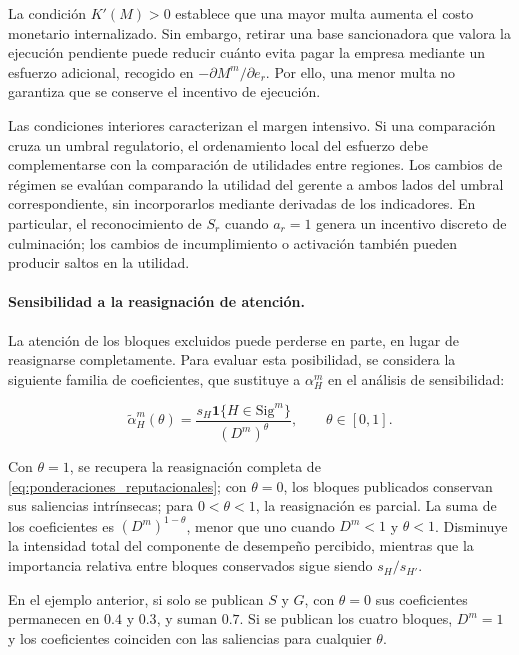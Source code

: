 La condición \(K'(M)>0\) establece que una mayor multa aumenta el costo monetario internalizado. Sin embargo, retirar una base sancionadora que valora la ejecución pendiente puede reducir cuánto evita pagar la empresa mediante un esfuerzo adicional, recogido en \(-\partial M^m/\partial e_r\). Por ello, una menor multa no garantiza que se conserve el incentivo de ejecución.

Las condiciones interiores caracterizan el margen intensivo. Si una comparación cruza un umbral regulatorio, el ordenamiento local del esfuerzo debe complementarse con la comparación de utilidades entre regiones. Los cambios de régimen se evalúan comparando la utilidad del gerente a ambos lados del umbral correspondiente, sin incorporarlos mediante derivadas de los indicadores. En particular, el reconocimiento de \(S_r\) cuando \(a_r=1\) genera un incentivo discreto de culminación; los cambios de incumplimiento o activación también pueden producir saltos en la utilidad.

\paragraph{Sensibilidad a la reasignación de atención.}

La atención de los bloques excluidos puede perderse en parte, en lugar de reasignarse completamente. Para evaluar esta posibilidad, se considera la siguiente familia de coeficientes, que sustituye a \(\alpha_H^m\) en el análisis de sensibilidad:

\begin{equation}
\label{eq:ponderaciones_reputacionales_sensibilidad}
\widetilde{\alpha}_H^m(\theta)
=
\frac{s_H\mathbf{1}\{H\in\mathrm{Sig}^m\}}
{(D^m)^\theta},
\qquad
\theta\in[0,1].
\end{equation}

Con \(\theta=1\), se recupera la reasignación completa de \eqref{eq:ponderaciones_reputacionales}; con \(\theta=0\), los bloques publicados conservan sus saliencias intrínsecas; para \(0<\theta<1\), la reasignación es parcial. La suma de los coeficientes es \((D^m)^{1-\theta}\), menor que uno cuando \(D^m<1\) y \(\theta<1\). Disminuye la intensidad total del componente de desempeño percibido, mientras que la importancia relativa entre bloques conservados sigue siendo \(s_H/s_{H'}\).

En el ejemplo anterior, si solo se publican \(S\) y \(G\), con \(\theta=0\) sus coeficientes permanecen en \(0.4\) y \(0.3\), y suman \(0.7\). Si se publican los cuatro bloques, \(D^m=1\) y los coeficientes coinciden con las saliencias para cualquier \(\theta\).


